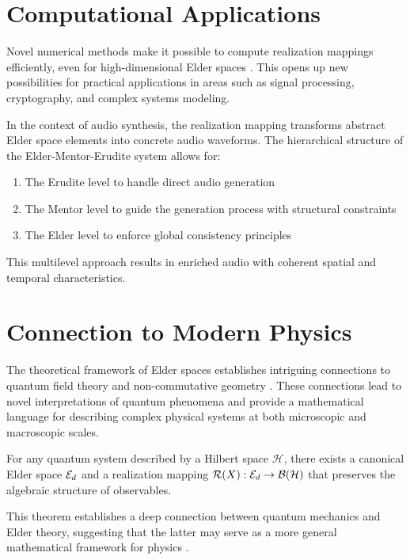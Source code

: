 \section{Computational Applications}

Novel numerical methods make it possible to compute realization mappings efficiently, even for high-dimensional Elder spaces \cite{elder_theory}. This opens up new possibilities for practical applications in areas such as signal processing, cryptography, and complex systems modeling.

\begin{example}
In the context of audio synthesis, the realization mapping transforms abstract Elder space elements into concrete audio waveforms. The hierarchical structure of the Elder-Mentor-Erudite system allows for:
\begin{enumerate}
    \item The Erudite level to handle direct audio generation
    \item The Mentor level to guide the generation process with structural constraints
    \item The Elder level to enforce global consistency principles
\end{enumerate}
This multilevel approach results in enriched audio with coherent spatial and temporal characteristics.
\end{example}

\section{Connection to Modern Physics}

The theoretical framework of Elder spaces establishes intriguing connections to quantum field theory and non-commutative geometry \cite{heliomorphic_math}. These connections lead to novel interpretations of quantum phenomena and provide a mathematical language for describing complex physical systems at both microscopic and macroscopic scales.

\begin{theorem}
For any quantum system described by a Hilbert space $\mathcal{H}$, there exists a canonical Elder space $\mathcal{E}_{d}$ and a realization mapping $\mathcal{R}(X): \mathcal{E}_{d} \rightarrow \mathcal{B}(\mathcal{H})$ that preserves the algebraic structure of observables.
\end{theorem}

This theorem establishes a deep connection between quantum mechanics and Elder theory, suggesting that the latter may serve as a more general mathematical framework for physics \cite{orbital_mechanics_learning}.

